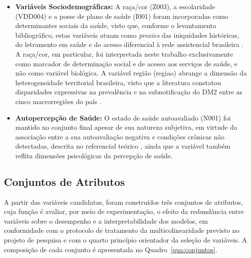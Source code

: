 \begin{itemize}
\item[] \textbf{Variáveis Sociodemográficas: }
A raça/cor (Z003), a escolaridade (VDD004) e a posse de plano de saúde (I001) foram incorporadas como determinantes sociais da saúde, visto que, conforme o levantamento bibliográfico, estas variáveis atuam como \textit{proxies} das iniquidades históricas, do letramento em saúde e do acesso diferencial à rede assistencial brasileira \cite{deAlmeida-Pititto09112015,muzy2021prevalencia,reis2022evolution}. A raça/cor, em particular, foi interpretada neste trabalho exclusivamente como marcador de determinação social e de acesso aos serviços de saúde, e não como variável biológica.
A variável região (regiao) abrange a dimensão da heterogeneidade territorial brasileira, visto que a literatura constatou disparidades expressivas na prevalência e na subnotificação do DM2 entre as cinco macrorregiões do país \cite{muzy2021prevalencia,deAlmeida-Pititto09112015,reis2022evolution}.

\item[] \textbf{Autopercepção de Saúde: }
O estado de saúde autoavaliado (N001) foi mantido no conjunto final apesar de sua natureza subjetiva, em virtude da associação entre a sua autoavaliação negativa e condições crônicas não detectadas, descrita no referencial teórico \cite{Rantanen2019}, ainda que a variável também reflita dimensões psicológicas da percepção de saúde. 
\end{itemize}

\subsection{Conjuntos de Atributos}\label{sec:conjuntos-atributos}
A partir das variáveis candidatas, foram construídos três conjuntos de atributos, cuja função é avaliar, por meio de experimentação, o efeito da redundância entre variáveis sobre o desempenho e a interpretabilidade dos modelos, em conformidade com o protocolo de tratamento da multicolinearidade previsto no projeto de pesquisa e com o quarto princípio orientador da seleção de variáveis. A composição de cada conjunto é apresentada no Quadro~\ref{qua:conjuntos}.

